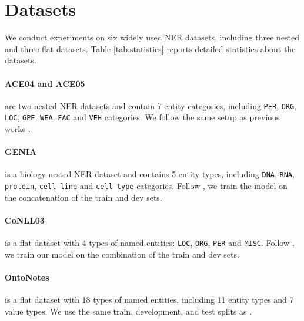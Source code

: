 \documentclass[11pt]{article}
\begin{document}
\begin{table*}[!ht]
\begin{tabular}{lccccccccc}
\end{tabular}

\caption{Statistics of the \textbf{\textit{nested}} 
 and \textbf{\textit{flat}} datasets used in our experiments.}
\label{tab:statistics}
\end{table*}



\section{Datasets}
\label{app:datasets}

We conduct experiments on six widely used NER datasets, including three nested and three flat datasets. Table \ref{tab:statistics} reports detailed statistics about the datasets.

\paragraph{ACE04 and ACE05} \citep{doddington-etal-2004-automatic, 2005-automatic} are two nested NER datasets and contain 7 entity categories, including \texttt{PER}, 
 \texttt{ORG}, \texttt{LOC}, \texttt{GPE}, \texttt{WEA},  \texttt{FAC} and \texttt{VEH} categories. We follow the same setup as previous works \citet{katiyar-cardie-2018-nested, lin-etal-2019-sequence}.

\paragraph{GENIA} \citep{10.5555/1289189.1289260} is a biology nested NER dataset and contains 5 entity types, including \texttt{DNA}, \texttt{RNA}, \texttt{protein}, \texttt{cell line} and \texttt{cell type} categories. Follow \citet{huang-etal-2022-pyramid, shen-etal-2021-locate}, we train the model on the concatenation of the train and dev sets.



\paragraph{CoNLL03}  \citep{tjong-kim-sang-de-meulder-2003-introduction} is a flat dataset with 4 types of named entities: \texttt{LOC}, \texttt{ORG}, \texttt{PER} and \texttt{MISC}. Follow \citet{yu-etal-2020-named, yan2021bartner, shen-etal-2021-locate}, we train our model on the combination of the train and dev sets.

\paragraph{OntoNotes} \citep{pradhan-etal-2013-towards} is a flat dataset with 18 types of named entities, including 11 entity types and 7 value types. We use the same train, development, and test splits as \citet{li-etal-2020-unified, shen-etal-2022-parallel}.
\end{document}
